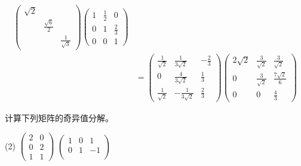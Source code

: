 \documentclass[12pt, a4paper, oneside, UTF8]{ctexbook}
\begin{document}
\begin{solution}
\begin{enumerate}[label=(\arabic*)]
\begin{align*}
\begin{pmatrix}
                \sqrt{2} & & \\
                & \frac{\sqrt{6}}{2}& \\
                & & \frac{1}{\sqrt{3}}
            \end{pmatrix}
            \begin{pmatrix}
                1 &\frac{1}{2}&0\\
                0 & 1&\frac{2}{3} \\
                0&0&1
            \end{pmatrix}\\
            &=\begin{pmatrix}
                \frac{1}{\sqrt{2}}& \frac{1}{3\sqrt{2}} & -\frac{2}{3}\\
                0& \frac{4}{3\sqrt{2}}& \frac{1}{3} \\
                \frac{1}{\sqrt{2}} & -\frac{1}{3\sqrt{2}}& \frac{2}{3}
            \end{pmatrix}
            \begin{pmatrix}
                2\sqrt{2} &\frac{3}{\sqrt{2}}&\frac{3}{\sqrt{2}}\\
                0 & \frac{3}{\sqrt{2}}&\frac{7\sqrt{2}}{6} \\
                0&0&\frac{4}{3}
            \end{pmatrix}
        \end{align*}
    \end{enumerate}
\end{solution}


\begin{question}
    计算下列矩阵的奇异值分解。
    \begin{tasks}[label=(\arabic*)](2)
        \task $\begin{pmatrix}
            2&0\\
            0&2\\
            1&1
        \end{pmatrix}$
        \task $\begin{pmatrix}
            1&0&1\\
            0&1&-1\\
        \end{pmatrix}$
    \end{tasks}
\end{question}
\end{document}
